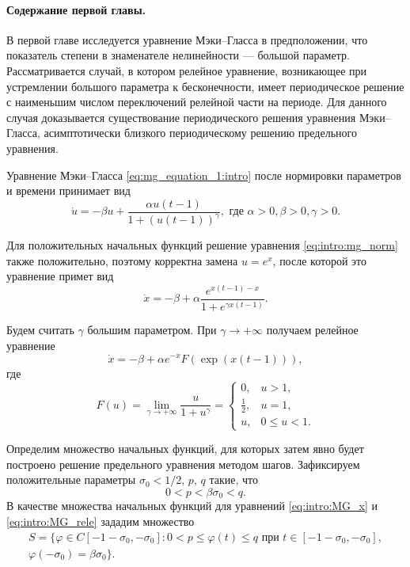 \paragraph{Содержание первой главы.} В первой главе исследуется уравнение Мэки--Гласса в предположении, что показатель степени в знаменателе нелинейности --- большой параметр. Рассматривается случай, в котором релейное уравнение, возникающее при устремлении большого параметра к бесконечности, имеет периодическое решение с наименьшим числом переключений релейной части на периоде. Для данного случая доказывается существование периодического решения уравнения Мэки--Гласса, асимптотически близкого периодическому решению предельного уравнения.

Уравнение Мэки--Гласса \eqref{eq:mg_equation_1:intro} после нормировки параметров и времени принимает вид
\begin{equation}
	\label{eq:intro:mg_norm}
	\dot{u}=-\beta u+\frac{\alpha u(t-1)}{1+(u(t-1))^\gamma}, \text{ где } \alpha > 0, \beta > 0, \gamma > 0.
\end{equation}

Для положительных начальных функций решение уравнения \eqref{eq:intro:mg_norm} также положительно, поэтому корректна замена $u = e^x$, после которой это уравнение примет вид
\begin{equation}
	\label{eq:intro:MG_x}
	\dot{x}=-\beta+\alpha\frac{e^{x(t-1)-x}}{1+e^{\gamma x(t-1)}}.
\end{equation}

Будем считать $\gamma$ большим параметром. При $\gamma \to +\infty$ получаем релейное уравнение
\begin{equation}
	\label{eq:intro:MG_rele}
	\dot{x}=-\beta + \alpha e^{-x} F(\exp({x(t-1)})),
\end{equation}
где
\begin{equation}
	\label{eq:intro:F}
	F(u)=\lim\limits_{\gamma\to +\infty}\frac{u}{1+u^{\gamma}}=
	\begin{cases}
		0, & u > 1,\\
		\frac{1}{2}, & u = 1,\\
		u, & 0 \leq u < 1.
	\end{cases}
\end{equation}

Определим множество начальных функций, для которых затем явно будет построено решение предельного уравнения методом шагов. Зафиксируем положительные параметры $\sigma_0 < 1/2$, $p$, $q$ такие, что 
%
\[0 < p < \beta \sigma_0 < q.\]
%
В качестве множества начальных функций для уравнений \eqref{eq:intro:MG_x} и \eqref{eq:intro:MG_rele} зададим множество
\begin{multline}
	\label{eq:intro:init_set}
	S=\{\varphi\in C[-1 - \sigma_0, -\sigma_0]: 0 < p \leqslant \varphi(t)\leqslant q \text{ при } t \in [-1 - \sigma_0, -\sigma_0],\\ \varphi(-\sigma_0) = \beta \sigma_0 \}.
\end{multline}

